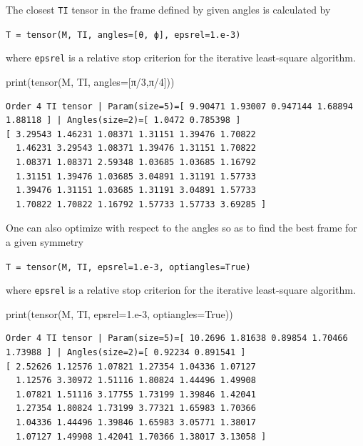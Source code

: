 \documentclass[
  letterpaper,
  DIV=11,
  numbers=noendperiod]{scrreprt}
\newenvironment{Shaded}{\begin{snugshade}}{\end{snugshade}}
\newcommand{\BuiltInTok}[1]{\textcolor[rgb]{0.00,0.23,0.31}{#1}}
\newcommand{\DecValTok}[1]{\textcolor[rgb]{0.68,0.00,0.00}{#1}}
\newcommand{\FloatTok}[1]{\textcolor[rgb]{0.68,0.00,0.00}{#1}}
\newcommand{\NormalTok}[1]{\textcolor[rgb]{0.00,0.23,0.31}{#1}}
\newcommand{\OperatorTok}[1]{\textcolor[rgb]{0.37,0.37,0.37}{#1}}
\newcommand{\VariableTok}[1]{\textcolor[rgb]{0.07,0.07,0.07}{#1}}
\begin{document}
The closest \texttt{TI} tensor in the frame defined by given angles is
calculated by

\texttt{T\ =\ tensor(M,\ TI,\ angles={[}θ,\ ϕ{]},\ epsrel=1.e-3)}

where \texttt{epsrel} is a relative stop criterion for the iterative
least-square algorithm.

\begin{Shaded}
\begin{Highlighting}[]
\BuiltInTok{print}\NormalTok{(tensor(M, TI, angles}\OperatorTok{=}\NormalTok{[π}\OperatorTok{/}\DecValTok{3}\NormalTok{,π}\OperatorTok{/}\DecValTok{4}\NormalTok{]))}
\end{Highlighting}
\end{Shaded}

\begin{verbatim}
Order 4 TI tensor | Param(size=5)=[ 9.90471 1.93007 0.947144 1.68894 1.88118 ] | Angles(size=2)=[ 1.0472 0.785398 ]
[ 3.29543 1.46231 1.08371 1.31151 1.39476 1.70822 
  1.46231 3.29543 1.08371 1.39476 1.31151 1.70822 
  1.08371 1.08371 2.59348 1.03685 1.03685 1.16792 
  1.31151 1.39476 1.03685 3.04891 1.31191 1.57733 
  1.39476 1.31151 1.03685 1.31191 3.04891 1.57733 
  1.70822 1.70822 1.16792 1.57733 1.57733 3.69285 ]
\end{verbatim}

One can also optimize with respect to the angles so as to find the best
frame for a given symmetry

\texttt{T\ =\ tensor(M,\ TI,\ epsrel=1.e-3,\ optiangles=True)}

where \texttt{epsrel} is a relative stop criterion for the iterative
least-square algorithm.

\begin{Shaded}
\begin{Highlighting}[]
\BuiltInTok{print}\NormalTok{(tensor(M, TI, epsrel}\OperatorTok{=}\FloatTok{1.e{-}3}\NormalTok{, optiangles}\OperatorTok{=}\VariableTok{True}\NormalTok{))}
\end{Highlighting}
\end{Shaded}

\begin{verbatim}
Order 4 TI tensor | Param(size=5)=[ 10.2696 1.81638 0.89854 1.70466 1.73988 ] | Angles(size=2)=[ 0.92234 0.891541 ]
[ 2.52626 1.12576 1.07821 1.27354 1.04336 1.07127 
  1.12576 3.30972 1.51116 1.80824 1.44496 1.49908 
  1.07821 1.51116 3.17755 1.73199 1.39846 1.42041 
  1.27354 1.80824 1.73199 3.77321 1.65983 1.70366 
  1.04336 1.44496 1.39846 1.65983 3.05771 1.38017 
  1.07127 1.49908 1.42041 1.70366 1.38017 3.13058 ]
\end{verbatim}
\end{document}
